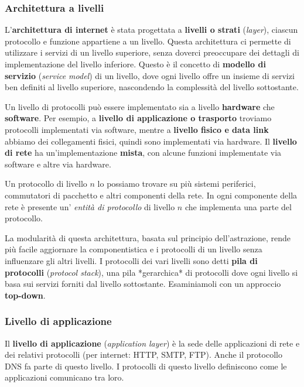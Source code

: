 \subsubsection{Architettura a livelli}
L'\textbf{architettura di internet} è stata progettata a \textbf{livelli o strati} (\textit{layer}), ciascun protocollo e funzione appartiene a un livello. Questa architettura ci permette di utilizzare i servizi di un livello superiore, senza doverci preoccupare dei dettagli di implementazione del livello inferiore. Questo è il concetto di \textbf{modello di servizio} (\textit{service model}) di un livello, dove ogni livello offre un insieme di servizi ben definiti al livello superiore, nascondendo la complessità del livello sottostante.

Un livello di protocolli può essere implementato sia a livello \textbf{hardware} che \textbf{software}. Per esempio, a \textbf{livello di applicazione o trasporto} troviamo protocolli implementati via software, mentre a \textbf{livello fisico e data link} abbiamo dei collegamenti fisici, quindi sono implementati via hardware. Il \textbf{livello di rete} ha un'implementazione \textbf{mista}, con alcune funzioni implementate via software e altre via hardware.

Un protocollo di livello $n$ lo possiamo trovare su più sistemi periferici, commutatori di pacchetto e altri componenti della rete. In ogni componente della rete è presente un' \textit{entità di protocollo} di livello $n$ che implementa una parte del protocollo.

La modularità di questa architettura, basata sul principio dell'astrazione, rende più facile aggiornare la componentistica e i protocolli di un livello senza influenzare gli altri livelli. I protocolli dei vari livelli sono detti \textbf{pila di protocolli} (\textit{protocol stack}), una pila *gerarchica* di protocolli dove ogni livello si basa sui servizi forniti dal livello sottostante. Esaminiamoli con un approccio \textbf{top-down}. 

\subsubsection*{Livello di applicazione}

Il \textbf{livello di applicazione} (\textit{application layer}) è la sede delle applicazioni di rete e dei relativi protocolli (per internet: HTTP, SMTP, FTP). Anche il protocollo DNS fa parte di questo livello. I protocolli di questo livello definiscono come le applicazioni comunicano tra loro.

